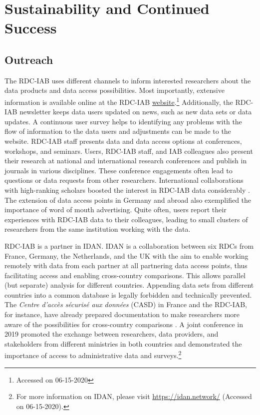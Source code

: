 \hypertarget{sustainability-and-continued-success}{%
\section{Sustainability and Continued Success}\label{sustainability-and-continued-success}}

\hypertarget{outreach}{%
\subsection{Outreach}\label{outreach}}

The RDC-IAB uses different channels to inform interested researchers about the data products and data access possibilities. Most importantly, extensive information is available online at the RDC-IAB \href{https://fdz.iab.de/en.aspx}{website}.\footnote{Accessed on 06-15-2020} Additionally, the RDC-IAB newsletter keeps data users updated on news, such as new data sets or data updates. A continuous user survey helps to identifying any problems with the flow of information to the data users and adjustments can be made to the website. RDC-IAB staff presents data and data access options at conferences, workshops, and seminars. Users, RDC-IAB staff, and IAB colleagues also present their research at national and international research conferences and publish in journals in various disciplines. These conference engagements often lead to questions or data requests from other researchers. International collaborations with high-ranking scholars boosted the interest in RDC-IAB data considerably \citep{card2015, schmieder2016}. The extension of data access points in Germany and abroad also exemplified the importance of word of mouth advertising. Quite often, users report their experiences with RDC-IAB data to their colleagues, leading to small clusters of researchers from the same institution working with the data.

RDC-IAB is a partner in IDAN. IDAN is a collaboration between six RDCs from France, Germany, the Netherlands, and the UK with the aim to enable working remotely with data from each partner at all partnering data access points, thus facilitating access and enabling cross-country comparisons. This allows parallel (but separate) analysis for different countries. Appending data sets from different countries into a common database is legally forbidden and technically prevented. The \emph{Centre d'accès sécurisé aux données} (CASD) in France and the RDC-IAB, for instance, have already prepared documentation to make researchers more aware of the possibilities for cross-country comparisons \citep{laible2020}. A joint conference in 2019 promoted the exchange between researchers, data providers, and stakeholders from different ministries in both countries and demonstrated the importance of access to administrative data and surveys.\footnote{For more information on IDAN, please visit \url{https://idan.network/} (Accessed on 06-15-2020).}

